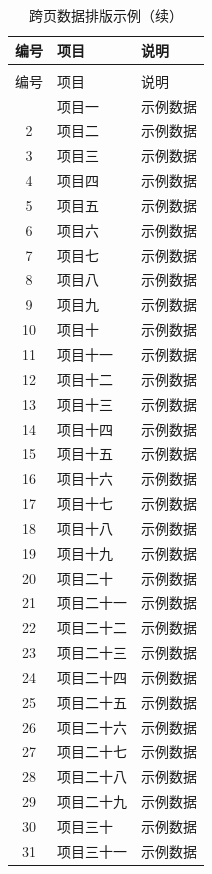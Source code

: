 \begin{longtable}{cll}
  \caption{跨页数据排版示例}\label{tab:long}\\
  \toprule 编号 & 项目 & 说明 \\ \midrule
  \endfirsthead
  \caption[]{跨页数据排版示例（续）}\\
  \toprule 编号 & 项目 & 说明 \\ \midrule
  \endhead
  \bottomrule
  \endfoot
  1 & 项目一 & 示例数据 \\
  2 & 项目二 & 示例数据 \\
  3 & 项目三 & 示例数据 \\
  4 & 项目四 & 示例数据 \\
  5 & 项目五 & 示例数据 \\
  6 & 项目六 & 示例数据 \\
  7 & 项目七 & 示例数据 \\
  8 & 项目八 & 示例数据 \\
  9 & 项目九 & 示例数据 \\
  10 & 项目十 & 示例数据 \\
  11 & 项目十一 & 示例数据 \\
  12 & 项目十二 & 示例数据 \\
  13 & 项目十三 & 示例数据 \\
  14 & 项目十四 & 示例数据 \\
  15 & 项目十五 & 示例数据 \\
  16 & 项目十六 & 示例数据 \\
  17 & 项目十七 & 示例数据 \\
  18 & 项目十八 & 示例数据 \\
  19 & 项目十九 & 示例数据 \\
  20 & 项目二十 & 示例数据 \\
  21 & 项目二十一 & 示例数据 \\
  22 & 项目二十二 & 示例数据 \\
  23 & 项目二十三 & 示例数据 \\
  24 & 项目二十四 & 示例数据 \\
  25 & 项目二十五 & 示例数据 \\
  26 & 项目二十六 & 示例数据 \\
  27 & 项目二十七 & 示例数据 \\
  28 & 项目二十八 & 示例数据 \\
  29 & 项目二十九 & 示例数据 \\
  30 & 项目三十 & 示例数据 \\
  31 & 项目三十一 & 示例数据 \\

\end{longtable}

